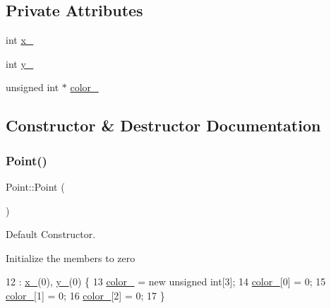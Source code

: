\subsection*{Private Attributes}
\begin{DoxyCompactItemize}
\item 
int \mbox{\hyperlink{class_point_acfe156c55546f7e551fb54c7ea08a6cb}{x\+\_\+}}
\item 
int \mbox{\hyperlink{class_point_ae45effa2adb0036e4a770abb9b1160e6}{y\+\_\+}}
\item 
unsigned int $\ast$ \mbox{\hyperlink{class_point_af3333647d73989850d2fbf64d14eb9cb}{color\+\_\+}}
\end{DoxyCompactItemize}


\subsection{Constructor \& Destructor Documentation}
\mbox{\label{class_point_ad92f2337b839a94ce97dcdb439b4325a}} 
\subsubsection{\texorpdfstring{Point()}{Point()}\hspace{0.1cm}{\footnotesize\ttfamily [1/3]}}
{\footnotesize\ttfamily Point\+::\+Point (\begin{DoxyParamCaption}{ }\end{DoxyParamCaption})}



Default Constructor. 

Initialize the members to zero 
\begin{DoxyCode}
12              : \mbox{\hyperlink{class_point_acfe156c55546f7e551fb54c7ea08a6cb}{x\_}}(0), \mbox{\hyperlink{class_point_ae45effa2adb0036e4a770abb9b1160e6}{y\_}}(0) \{
13     \mbox{\hyperlink{class_point_af3333647d73989850d2fbf64d14eb9cb}{color\_}} = \textcolor{keyword}{new} \textcolor{keywordtype}{unsigned} \textcolor{keywordtype}{int}[3];
14     \mbox{\hyperlink{class_point_af3333647d73989850d2fbf64d14eb9cb}{color\_}}[0] = 0;
15     \mbox{\hyperlink{class_point_af3333647d73989850d2fbf64d14eb9cb}{color\_}}[1] = 0;
16     \mbox{\hyperlink{class_point_af3333647d73989850d2fbf64d14eb9cb}{color\_}}[2] = 0;
17 \}
\end{DoxyCode}
\mbox{\label{class_point_af6c52ba545e9d933632b6d4edbf86622}} 
